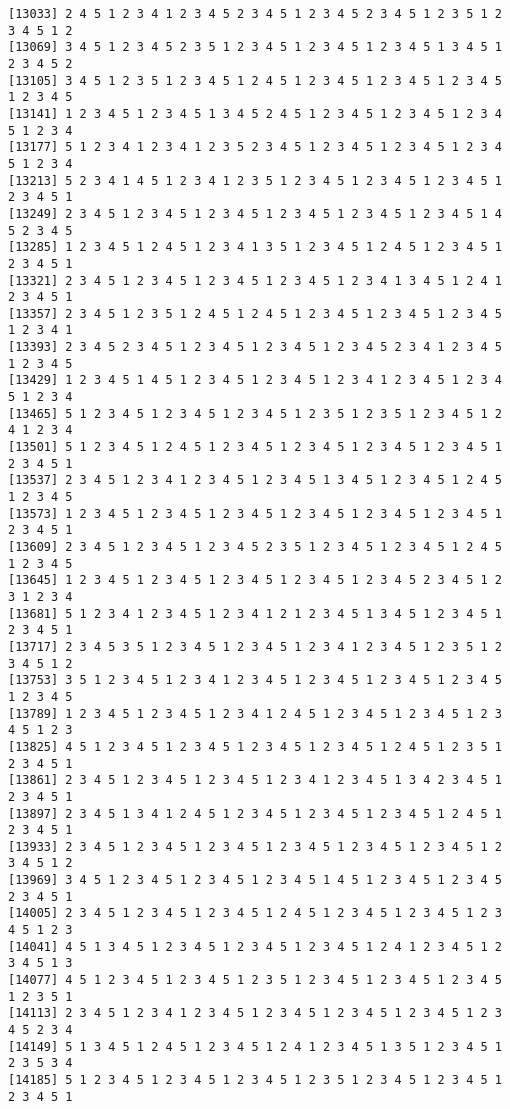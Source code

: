 \documentclass[
  11pt,
]{book}
\begin{document}
\begin{verbatim}
[13033] 2 4 5 1 2 3 4 1 2 3 4 5 2 3 4 5 1 2 3 4 5 2 3 4 5 1 2 3 5 1 2 3 4 5 1 2
[13069] 3 4 5 1 2 3 4 5 2 3 5 1 2 3 4 5 1 2 3 4 5 1 2 3 4 5 1 3 4 5 1 2 3 4 5 2
[13105] 3 4 5 1 2 3 5 1 2 3 4 5 1 2 4 5 1 2 3 4 5 1 2 3 4 5 1 2 3 4 5 1 2 3 4 5
[13141] 1 2 3 4 5 1 2 3 4 5 1 3 4 5 2 4 5 1 2 3 4 5 1 2 3 4 5 1 2 3 4 5 1 2 3 4
[13177] 5 1 2 3 4 1 2 3 4 1 2 3 5 2 3 4 5 1 2 3 4 5 1 2 3 4 5 1 2 3 4 5 1 2 3 4
[13213] 5 2 3 4 1 4 5 1 2 3 4 1 2 3 5 1 2 3 4 5 1 2 3 4 5 1 2 3 4 5 1 2 3 4 5 1
[13249] 2 3 4 5 1 2 3 4 5 1 2 3 4 5 1 2 3 4 5 1 2 3 4 5 1 2 3 4 5 1 4 5 2 3 4 5
[13285] 1 2 3 4 5 1 2 4 5 1 2 3 4 1 3 5 1 2 3 4 5 1 2 4 5 1 2 3 4 5 1 2 3 4 5 1
[13321] 2 3 4 5 1 2 3 4 5 1 2 3 4 5 1 2 3 4 5 1 2 3 4 1 3 4 5 1 2 4 1 2 3 4 5 1
[13357] 2 3 4 5 1 2 3 5 1 2 4 5 1 2 4 5 1 2 3 4 5 1 2 3 4 5 1 2 3 4 5 1 2 3 4 1
[13393] 2 3 4 5 2 3 4 5 1 2 3 4 5 1 2 3 4 5 1 2 3 4 5 2 3 4 1 2 3 4 5 1 2 3 4 5
[13429] 1 2 3 4 5 1 4 5 1 2 3 4 5 1 2 3 4 5 1 2 3 4 1 2 3 4 5 1 2 3 4 5 1 2 3 4
[13465] 5 1 2 3 4 5 1 2 3 4 5 1 2 3 4 5 1 2 3 5 1 2 3 5 1 2 3 4 5 1 2 4 1 2 3 4
[13501] 5 1 2 3 4 5 1 2 4 5 1 2 3 4 5 1 2 3 4 5 1 2 3 4 5 1 2 3 4 5 1 2 3 4 5 1
[13537] 2 3 4 5 1 2 3 4 1 2 3 4 5 1 2 3 4 5 1 3 4 5 1 2 3 4 5 1 2 4 5 1 2 3 4 5
[13573] 1 2 3 4 5 1 2 3 4 5 1 2 3 4 5 1 2 3 4 5 1 2 3 4 5 1 2 3 4 5 1 2 3 4 5 1
[13609] 2 3 4 5 1 2 3 4 5 1 2 3 4 5 2 3 5 1 2 3 4 5 1 2 3 4 5 1 2 4 5 1 2 3 4 5
[13645] 1 2 3 4 5 1 2 3 4 5 1 2 3 4 5 1 2 3 4 5 1 2 3 4 5 2 3 4 5 1 2 3 1 2 3 4
[13681] 5 1 2 3 4 1 2 3 4 5 1 2 3 4 1 2 1 2 3 4 5 1 3 4 5 1 2 3 4 5 1 2 3 4 5 1
[13717] 2 3 4 5 3 5 1 2 3 4 5 1 2 3 4 5 1 2 3 4 1 2 3 4 5 1 2 3 5 1 2 3 4 5 1 2
[13753] 3 5 1 2 3 4 5 1 2 3 4 1 2 3 4 5 1 2 3 4 5 1 2 3 4 5 1 2 3 4 5 1 2 3 4 5
[13789] 1 2 3 4 5 1 2 3 4 5 1 2 3 4 1 2 4 5 1 2 3 4 5 1 2 3 4 5 1 2 3 4 5 1 2 3
[13825] 4 5 1 2 3 4 5 1 2 3 4 5 1 2 3 4 5 1 2 3 4 5 1 2 4 5 1 2 3 5 1 2 3 4 5 1
[13861] 2 3 4 5 1 2 3 4 5 1 2 3 4 5 1 2 3 4 1 2 3 4 5 1 3 4 2 3 4 5 1 2 3 4 5 1
[13897] 2 3 4 5 1 3 4 1 2 4 5 1 2 3 4 5 1 2 3 4 5 1 2 3 4 5 1 2 4 5 1 2 3 4 5 1
[13933] 2 3 4 5 1 2 3 4 5 1 2 3 4 5 1 2 3 4 5 1 2 3 4 5 1 2 3 4 5 1 2 3 4 5 1 2
[13969] 3 4 5 1 2 3 4 5 1 2 3 4 5 1 2 3 4 5 1 4 5 1 2 3 4 5 1 2 3 4 5 2 3 4 5 1
[14005] 2 3 4 5 1 2 3 4 5 1 2 3 4 5 1 2 4 5 1 2 3 4 5 1 2 3 4 5 1 2 3 4 5 1 2 3
[14041] 4 5 1 3 4 5 1 2 3 4 5 1 2 3 4 5 1 2 3 4 5 1 2 4 1 2 3 4 5 1 2 3 4 5 1 3
[14077] 4 5 1 2 3 4 5 1 2 3 4 5 1 2 3 5 1 2 3 4 5 1 2 3 4 5 1 2 3 4 5 1 2 3 5 1
[14113] 2 3 4 5 1 2 3 4 1 2 3 4 5 1 2 3 4 5 1 2 3 4 5 1 2 3 4 5 1 2 3 4 5 2 3 4
[14149] 5 1 3 4 5 1 2 4 5 1 2 3 4 5 1 2 4 1 2 3 4 5 1 3 5 1 2 3 4 5 1 2 3 5 3 4
[14185] 5 1 2 3 4 5 1 2 3 4 5 1 2 3 4 5 1 2 3 5 1 2 3 4 5 1 2 3 4 5 1 2 3 4 5 1

\end{verbatim}
\end{document}
